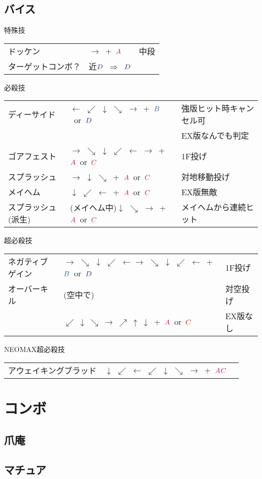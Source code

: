 \documentclass[a4j,11pt]{jarticle}
\def\A{$\textcolor{Acolor}{A}$}
\def\C{$\textcolor{Ccolor}{C}$}
\def\B{$\textcolor{Bcolor}{B}$}
\def\D{$\textcolor{Dcolor}{D}$}
\def\hado{$\downarrow$ $\searrow$ $\rightarrow$}%
\def\tatsu{$\downarrow$ $\swarrow$ $\leftarrow$}%
\def\syoryu{$\rightarrow$ $\downarrow$ $\searrow$}%
\def\yoga{$\leftarrow$ $\swarrow$ $\downarrow$ $\searrow$ $\rightarrow$}%
\def\gyakuyoga{$\rightarrow$ $\searrow$ $\downarrow$ $\swarrow$ $\leftarrow$}%
\def\tenti{$\rightarrow$ $\searrow$ $\downarrow$ $\swarrow$ $\leftarrow$ $\rightarrow$}%
\def\orochi{$\downarrow$ $\swarrow$ $\leftarrow$ $\swarrow$ $\downarrow$ $\searrow$ $\rightarrow$}%
\def\Cancel{$\Longrightarrow$}
\begin{document}
\subsection{バイス}
\begin{itembox}[l]{特殊技}
\begin{tabular}{lll}
ドッケン&$\rightarrow$\ +\ \A&中段\\%
ターゲットコンボ？&近\D\ \Cancel\ \D&%
\end{tabular}
\end{itembox}
\begin{itembox}[l]{必殺技}
\begin{tabular}{lll}
ディーサイド&\yoga\ +\ \B\ or\ \D&強版ヒット時キャンセル可\\
&&EX版なんでも判定\\%
ゴアフェスト&\tenti\ +\ \A\ or\ \C&1F投げ\\%
スプラッシュ&\syoryu\ +\ \A\ or\ \C&対地移動投げ\\%
メイヘム&\tatsu\ +\ \A\ or\ \C&EX版無敵\\%
スプラッシュ(派生)&(メイヘム中)\hado\ +\ \A\ or\ \C&メイヘムから連続ヒット%
\end{tabular}
\end{itembox}
\begin{itembox}[l]{超必殺技}
\begin{tabular}{lll}
ネガティブゲイン&\gyakuyoga\gyakuyoga\ +\ \B\ or\ \D&1F投げ\\%
オーバーキル&(空中で)&対空投げ \\%
&$\swarrow\ \downarrow\ \searrow\ \rightarrow\ \nearrow\ \uparrow\
\downarrow$\ +\ \A\ or\ \C&EX版なし
\end{tabular}
\end{itembox}
\begin{itembox}[l]{NEOMAX超必殺技}
\begin{tabular}{lll}
アウェイキングブラッド&\orochi\ +\ \A\C&%
\end{tabular}
\end{itembox}
\newpage
\section{コンボ}
\subsection{爪庵}
\newpage
\subsection{マチュア}
\end{document}
